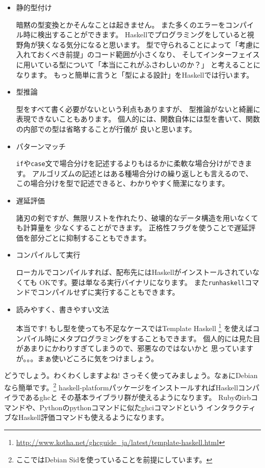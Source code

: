 \documentclass[mingoth,a4paper]{jsarticle}
\begin{document}
\begin{itemize}
\item 静的型付け

暗黙の型変換とかそんなことは起きません。
また多くのエラーをコンパイル時に検出することができます。
Haskellでプログラミングをしていると視野角が狭くなる気分になると思います。
型で守られることによって「考慮に入れておくべき前提」のコード範囲が小さくなり、
そしてインターフェイスに用いている型について「本当にこれがふさわしいのか？」
と考えることになります。
もっと簡単に言うと「型による設計」をHaskellでは行います。

\item 型推論

型をすべて書く必要がないという利点もありますが、
型推論がないと綺麗に表現できないこともあります。
個人的には、関数自体には型を書いて、関数の内部での型は省略することが行儀が
良いと思います。

\item パターンマッチ

\texttt{if}や\texttt{case}文で場合分けを記述するよりもはるかに柔軟な場合分けができます。
アルゴリズムの記述とはある種場合分けの繰り返しとも言えるので、
この場合分けを型で記述できると、わかりやすく簡潔になります。

\item 遅延評価

諸刃の剣ですが、無限リストを作れたり、破壊的なデータ構造を用いなくても計算量を
少なくすることができます。
正格性フラグを使うことで遅延評価を部分ごとに抑制することもできます。

\item コンパイルして実行

ローカルでコンパイルすれば、配布先にはHaskellがインストールされていなくても
OKです。要は単なる実行バイナリになります。
また\texttt{runhaskell}コマンドでコンパイルせずに実行することもできます。

\item 読みやすく、書きやすい文法

本当です!
もし型を使っても不足なケースではTemplate Haskell
\footnote{\url{http://www.kotha.net/ghcguide_ja/latest/template-haskell.html}}
を使えばコンパイル時にメタプログラミングをすることもできます。
個人的には見た目があまりにかわりすぎてしまうので、邪悪なのではないかと
思っていますが。。。まぁ使いどころに気をつけましょう。

\end{itemize}

どうでしょう。わくわくしますよね!
さっそく使ってみましょう。なぁにDebianなら簡単です。\footnote{ここではDebian Sidを使っていることを前提にしています。}
haskell-platformパッケージをインストールすればHaskellコンパイラであるghcと
その基本ライブラリ群が使えるようになります。
Rubyのirbコマンドや、Pythonのpythonコマンドに似たghciコマンドという
インタラクティブなHaskell評価コマンドも使えるようになります。
\end{document}
